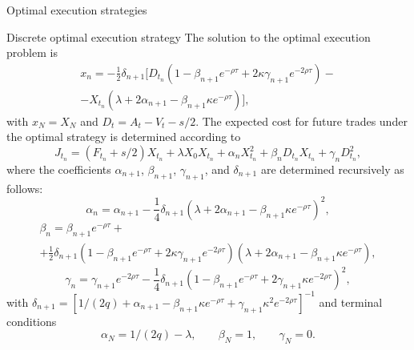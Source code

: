 \documentclass[]{beamer}
\begin{document}
\begin{frame}[t]
\begin{columns}[t]
\begin{column}{\onecolwid}
\begin{block}{Optimal execution strategies }
            \begin{alertblock}{Discrete optimal execution strategy}
                The solution to the optimal execution problem is
                \begin{multline*}
                    x_n = - \frac{1}{2} \delta_{n + 1} [D_{t_n} (1 - \beta_{n + 1} e^{ - \rho \tau} + 2 \kappa \gamma_{n+1} e^{ - 2 \rho \tau}) 
                    - \\ - X_{t_n} (\lambda + 2 \alpha_{n+1} - \beta_{n+1}\kappa e^{ - \rho \tau}) ], 
                \end{multline*}
                with $x_N = X_N$ and $D_t = A_t - V_t - s/2$. The expected cost for future trades under the optimal
                strategy is determined according to
                \begin{equation*}
                    J_{t_n} = (F_{t_n} + s/2) X_{t_n} + \lambda X_0 X_{t_n} + \alpha_n X_{t_n} ^2 + \beta_{n} D_{t_n} X_{t_n} + \gamma_n D_{t_n}^2, 
                \end{equation*}
                where the coefficients $\alpha_{n+1}$, $\beta_{n+1}$, $\gamma_{n+1}$, and $\delta_{n+1}$ are determined recursively as follows:
                \begin{equation*}
                    \alpha_{n} = \alpha_{n+1} - \frac{1}{4} \delta _{n+1} (\lambda + 2 \alpha_{n+1} - \beta_{n+1} \kappa e^{- \rho \tau})^2, 
                \end{equation*}
                \begin{multline*}
                    \beta_{n} =  \beta_{n+1} e^{- \rho \tau}  + 
                    \\ + \frac{1}{2} \delta _{n+1} (1 - \beta_{n+1} e^{- \rho \tau} 
                     + 2 \kappa \gamma_{n+1} e^{- 2 \rho \tau}) (\lambda + 2 \alpha_{n+1} - \beta_{n+1} \kappa e^{-\rho \tau}), 
                \end{multline*}
                \begin{equation*}
                     \gamma_n =   \gamma_{n+1} e^{- 2 \rho \tau} - \frac{1}{4} \delta _{n+1} (1 - \beta _{n+1} e^{- \rho \tau} 
                + 2 \gamma _{n+1} \kappa e^{- 2 \rho \tau})^2, 
                \end{equation*}
                with $\delta_{n+1} = [1/(2q) + \alpha_{n+1} - \beta_{n+1} \kappa e^{-\rho \tau} + \gamma _{n+1} \kappa ^2 e^{- 2 \rho \tau}]^{-1}$ and terminal conditions
                \begin{equation*}
                    \alpha_{N} = 1/(2q) - \lambda, \;\;\;\;\;\;\; \beta_N = 1, \;\;\;\;\;\;\; \gamma_N = 0.
                \end{equation*}
            \end{alertblock}
    

\end{block}
\end{column}
\end{columns}
\end{frame}
\end{document}

